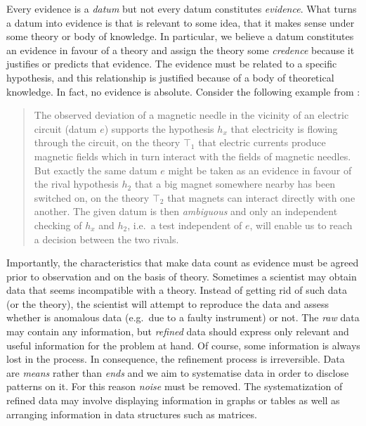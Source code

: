 \documentclass[
]{book}
\begin{document}
Every evidence is a \emph{datum} but not every datum constitutes \emph{evidence}. What turns a datum into evidence is that is relevant to some idea, that it makes sense under some theory or body of knowledge. In particular, we believe a datum constitutes an evidence in favour of a theory and assign the theory some \emph{credence} because it justifies or predicts that evidence. The evidence must be related to a specific hypothesis, and this relationship is justified because of a body of theoretical knowledge. In fact, no evidence is absolute. Consider the following example from \citep{bunge2017philosophy}:

\begin{quote}
The observed deviation of a magnetic needle in the vicinity of an electric circuit (datum \(e\)) supports the hypothesis \(h_x\) that electricity is flowing through the circuit, on the theory \(⊤_1\) that electric currents produce magnetic fields which in turn interact with the fields of magnetic needles. But exactly the same datum \(e\) might be taken as an evidence in favour of the rival hypothesis \(h_2\) that a big magnet somewhere nearby has been switched on, on the theory \(⊤_2\) that magnets can interact directly with one another. The given datum is then \emph{ambiguous} and only an independent checking of \(h_x\) and \(h_2\), i.e.~a test independent of \(e\), will enable us to reach a decision between the two rivals.
\end{quote}

Importantly, the characteristics that make data count as evidence must be agreed prior to observation and on the basis of theory. Sometimes a scientist may obtain data that seems incompatible with a theory. Instead of getting rid of such data (or the theory), the scientist will attempt to reproduce the data and assess whether is anomalous data (e.g.~due to a faulty instrument) or not. The \emph{raw} data may contain any information, but \emph{refined} data should express only relevant and useful information for the problem at hand. Of course, some information is always lost in the process. In consequence, the refinement process is irreversible. Data are \emph{means} rather than \emph{ends} and we aim to systematise data in order to disclose patterns on it. For this reason \emph{noise} must be removed. The systematization of refined data may involve displaying information in graphs or tables as well as arranging information in data structures such as matrices.
\end{document}

